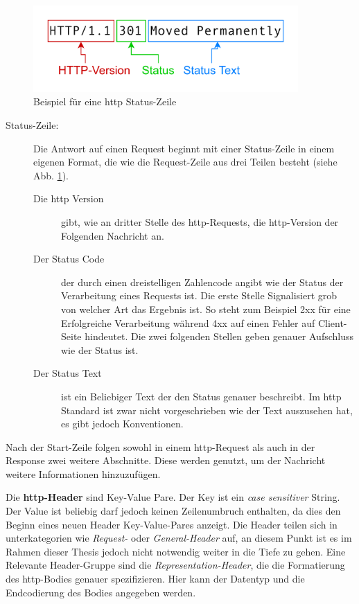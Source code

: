 \begin{figure}[!hbt]
     \centering
     \includegraphics[width=0.9\textwidth]{./images/HTTP-Statusline.png}
     \caption{Beispiel für eine \ac{http} Status-Zeile}
     \label{fig:http-statusline}
 \end{figure}


\begin{description}
     \item[Status-Zeile:] Die Antwort auf einen Request beginnt mit einer Status-Zeile in einem eigenen Format, die wie die Request-Zeile aus drei Teilen besteht (siehe Abb. \ref{fig:http-statusline}).
     \begin{description}
          \item[Die \ac{http} Version] gibt, wie an dritter Stelle des \ac{http}-Requests, die \ac{http}-Version der Folgenden Nachricht an.
          \item[Der Status Code] der durch einen dreistelligen Zahlencode angibt wie der Status der Verarbeitung eines Requests ist. 
          Die erste Stelle Signalisiert grob von welcher Art das Ergebnis ist. 
          So steht zum Beispiel 2xx für eine Erfolgreiche Verarbeitung während 4xx auf einen Fehler auf Client-Seite hindeutet.
          Die zwei folgenden Stellen geben genauer Aufschluss wie der Status ist\cite{HTTPResponseStatus2023}.
          \item[Der Status Text] ist ein Beliebiger Text der den Status genauer beschreibt.
          Im \ac{http} Standard ist zwar nicht vorgeschrieben wie der Text auszusehen hat, es gibt jedoch Konventionen\cite{HTTPResponseStatus2023}.
     \end{description}
\end{description}

Nach der Start-Zeile folgen sowohl in einem \ac{http}-Request als auch in der Response zwei weitere Abschnitte. 
Diese werden genutzt, um der Nachricht weitere Informationen hinzuzufügen.

Die \textbf{\ac{http}-Header} sind Key-Value Pare. Der Key ist ein \textit{case sensitiver} String.
Der Value ist beliebig darf jedoch keinen Zeilenumbruch enthalten, da dies den Beginn eines neuen Header Key-Value-Pares anzeigt.
Die Header teilen sich in unterkategorien wie \textit{Request-} oder \textit{General-Header} auf, an diesem Punkt ist es im Rahmen dieser Thesis jedoch nicht notwendig weiter in die Tiefe zu gehen.
Eine Relevante Header-Gruppe sind die \textit{Representation-Header}, die die Formatierung des \ac{http}-Bodies genauer spezifizieren.
Hier kann der Datentyp und die Endcodierung des Bodies angegeben werden.

